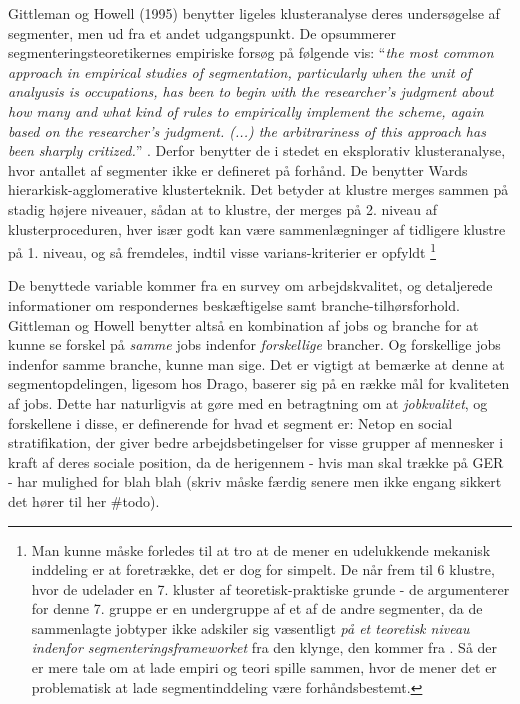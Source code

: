 Gittleman og Howell (1995) benytter ligeles klusteranalyse deres undersøgelse af segmenter, men ud fra et andet udgangspunkt. De opsummerer segmenteringsteoretikernes empiriske forsøg på følgende vis: “\emph{the most common approach in empirical studies of segmentation, particularly when the unit of analyusis is occupations, has been to begin with the researcher's judgment about how many and what kind of rules to empirically implement the scheme, again based on the researcher's judgment. (...) the arbitrariness of this approach has been sharply critized.}” \parencite[422]{Gittleman1995}. Derfor benytter de i stedet en eksplorativ klusteranalyse, hvor antallet af segmenter ikke er defineret på forhånd. De benytter Wards hierarkisk-agglomerative klusterteknik. Det betyder at klustre merges sammen på stadig højere niveauer, sådan at to klustre, der merges på 2. niveau af klusterproceduren, hver især godt kan være sammenlægninger af tidligere klustre på 1. niveau, og så fremdeles, indtil visse varians-kriterier er opfyldt \parencite[425]{Gittleman1995}%
%
\footnote{
Man kunne måske forledes til at tro at de mener en udelukkende mekanisk inddeling er at foretrække, det er dog for simpelt. De når frem til 6 klustre, hvor de udelader en 7. kluster af teoretisk-praktiske grunde - de argumenterer for denne 7. gruppe er en undergruppe af et af de andre segmenter, da de sammenlagte jobtyper ikke adskiler sig væsentligt \emph{på et teoretisk niveau indenfor segmenteringsframeworket} fra den klynge, den kommer fra \parencite[424]{Gittleman1995}. Så der er mere tale om at lade empiri og teori spille sammen, hvor de mener det er problematisk at lade segmentinddeling være forhåndsbestemt.}%
%

De benyttede variable kommer fra en survey om arbejdskvalitet, og detaljerede informationer om respondernes beskæftigelse samt branche-tilhørsforhold. Gittleman og Howell benytter altså en kombination af jobs og branche for at kunne se forskel på \emph{samme} jobs indenfor \emph{forskellige} brancher. Og forskellige jobs indenfor samme branche, kunne man sige. 
Det er vigtigt at bemærke at denne at segmentopdelingen, ligesom hos Drago, baserer sig på en række mål for kvaliteten af jobs. Dette har naturligvis at gøre med en betragtning om at \emph{jobkvalitet}, og forskellene i disse, er definerende for hvad et segment er: Netop en social stratifikation, der giver bedre arbejdsbetingelser for visse grupper af mennesker i kraft af deres sociale position, da de herigennem - hvis man skal trække på GER - har mulighed for blah blah (skriv måske færdig senere men ikke engang sikkert det hører til her \#todo).

